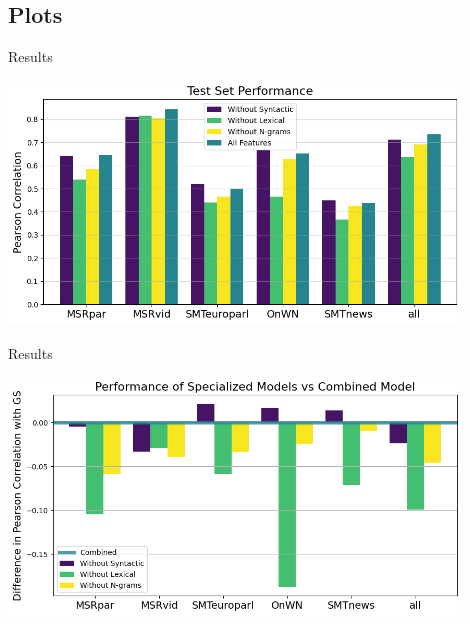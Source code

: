 \documentclass{beamer}
\begin{document}
\subsection{Plots}
\begin{frame}{Results}
    \begin{center}
        \includegraphics[width=0.9\textwidth]{figures/performance.png}
    \end{center}
\end{frame}
\begin{frame}{Results}
    \begin{center}
        \includegraphics[width=0.9\textwidth]{figures/relative-performance.png}
    \end{center}
\end{frame}
\end{document}
